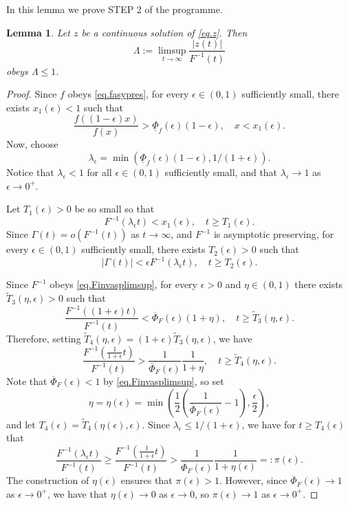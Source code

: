 \documentclass[a4paper,10pt,reqno]{amsart}
\numberwithin{equation}{section}
\newtheorem{lemma}{Lemma}
\theoremstyle{definition}
\theoremstyle{remark}
\DeclareMathOperator{\1}{\mathbbm 1}
\begin{document}
	In this lemma we prove STEP 2 of the programme.
	\begin{lemma} \label{lemma.step2zsimFinv}
		Let $z$ be a continuous solution of \eqref{eq.z}. Then
		\[
		\Lambda:=\limsup_{t\to\infty} \frac{|z(t)|}{F^{-1}(t)}
		\] 
		obeys $\Lambda\leq 1$.   	
	\end{lemma}
	\begin{proof}
		Since $f$ obeys \eqref{eq.fasypres}, for every $\epsilon\in (0,1)$ sufficiently small, there exists $x_1(\epsilon)<1$ such that 
		\begin{equation}   \label{eq.epsfasypres}
			\frac{f((1-\epsilon)x)}{f(x)}> \underline{\Phi}_f(\epsilon)(1-\epsilon), \quad x<x_1(\epsilon).
		\end{equation}
		Now, choose 
		\[
		\lambda_\epsilon=\min(\underline{\Phi}_f(\epsilon)(1-\epsilon),1/(1+\epsilon)).
		\]
		Notice that $\lambda_\epsilon<1$ for all $\epsilon\in (0,1)$ sufficiently small, and that $\lambda_\epsilon\to 1$ as $\epsilon\to 0^+$. 
		
		Let $T_1(\epsilon)>0$ be so small so that 
		\begin{equation} \label{eq.T1}
			F^{-1}(\lambda_\epsilon t)<x_1(\epsilon), \quad t\geq T_1(\epsilon).
		\end{equation}
		Since $\Gamma(t)=o(F^{-1}(t))$ as $t\to\infty$, and $F^{-1}$ is asymptotic preserving, for every $\epsilon\in (0,1)$ sufficiently small, there exists $T_2(\epsilon)>0$ such that
		\begin{equation} \label{eq.Gammabound}
			|\Gamma(t)|<\epsilon F^{-1}(\lambda_\epsilon t), \quad t\geq T_2(\epsilon).
		\end{equation}
		
		Since $F^{-1}$ obeys \eqref{eq.Finvasplimsup}, 
		for every 
		$\epsilon>0$ and $\eta\in (0,1)$ there exists $\tilde{T}_3(\eta,\epsilon)>0$ such that 
		\[
		\frac{F^{-1}((1+\epsilon)t)}{F^{-1}(t)}<\overline{\Phi}_F(\epsilon)(1+\eta), \quad t\geq \tilde{T}_3(\eta,\epsilon).
		\]
		Therefore, setting $\tilde{T}_4(\eta,\epsilon)=(1+\epsilon) \tilde{T}_3(\eta,\epsilon)$, we have 
		\[
		\frac{F^{-1}(\frac{1}{1+\epsilon}t)}{F^{-1}(t)}>\frac{1}{\overline{\Phi}_F(\epsilon)}\frac{1}{1+\eta}, \quad t\geq \tilde{T}_4(\eta,\epsilon).
		\]
		Note that $\overline{\Phi}_F(\epsilon)<1$ by \eqref{eq.Finvasplimsup}, so set 
		\[
		\eta=\eta(\epsilon)=\min\left(\frac{1}{2}\left(\frac{1}{\overline{\Phi}_F(\epsilon)}-1\right),\frac{\epsilon}{2} \right),
		\]
		and let $T_4(\epsilon)=\tilde{T}_4(\eta(\epsilon),\epsilon)$. Since   $\lambda_\epsilon\leq 1/(1+\epsilon)$, we have for $t\geq T_4(\epsilon)$  that
		\begin{equation} \label{eq.boundforic}
			\frac{F^{-1}(\lambda_\epsilon t)}{F^{-1}(t)}\geq 
			\frac{F^{-1}(\frac{1}{1+\epsilon}t)}{F^{-1}(t)}>
			\frac{1}{\overline{\Phi}_F(\epsilon)}\frac{1}{1+\eta(\epsilon)}=: \pi(\epsilon).
		\end{equation}
		The construction of $\eta(\epsilon)$ ensures that $\pi(\epsilon)>1$. However, since $\overline{\Phi}_F(\epsilon)\to 1$ as $\epsilon\to 0^+$, we have that $\eta(\epsilon)\to 0$ as $\epsilon\to 0$, so $\pi(\epsilon)\to 1$ as $\epsilon\to 0^+$.  
		

\end{proof}
\end{document}
